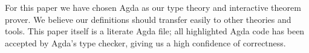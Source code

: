For this paper we have chosen Agda as our type theory and interactive theorem prover. We believe our definitions should transfer easily to other theories and tools. This paper itself is a literate Agda file; all highlighted Agda code has been accepted by Agda's type checker, giving us a high confidence of correctness.






